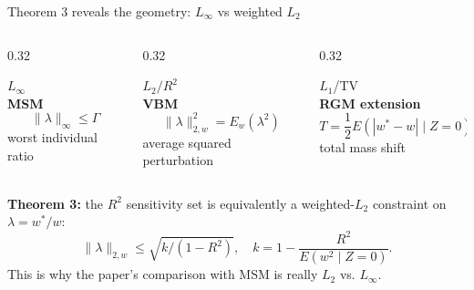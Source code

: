 \documentclass[aspectratio=169,10pt]{ctexbeamer}
\begin{document}
\begin{frame}{Theorem 3 reveals the geometry: $L_\infty$ vs weighted $L_2$}
  \begin{columns}[T,totalwidth=\textwidth]
    \begin{column}{0.32\textwidth}
      \begin{orangebox}
        \centering
        {\huge $L_\infty$}\\[0.3em]
        \textbf{MSM}\\[0.25em]
        \[
          \|\lambda\|_\infty\le \Gamma
        \]
        \small worst individual ratio
      \end{orangebox}
    \end{column}
    \begin{column}{0.32\textwidth}
      \begin{bluebox}
        \centering
        {\huge $L_2/R^2$}\\[0.3em]
        \textbf{VBM}\\[0.25em]
        \[
          \|\lambda\|_{2,w}^2
          =
          E_w(\lambda^2)
        \]
        \small average squared perturbation
      \end{bluebox}
    \end{column}
    \begin{column}{0.32\textwidth}
      \begin{yellowbox}
        \centering
        {\huge $L_1$/TV}\\[0.3em]
        \textbf{RGM extension}\\[0.25em]
        \[
          T=\frac12 E(|w^*-w|\mid Z=0)
        \]
        \small total mass shift
      \end{yellowbox}
    \end{column}
  \end{columns}
  \vspace{0.15cm}
  \begin{graybox}
    \small
    \textbf{Theorem 3:} the $R^2$ sensitivity set is equivalently a weighted-$L_2$ constraint on
    $\lambda=w^*/w$:
    \[
      \|\lambda\|_{2,w}\le \sqrt{k/(1-R^2)},
      \quad
      k=1-\frac{R^2}{E(w^2\mid Z=0)}.
    \]
    This is why the paper's comparison with MSM is really $L_2$ vs. $L_\infty$.
  \end{graybox}
\end{frame}
\end{document}
